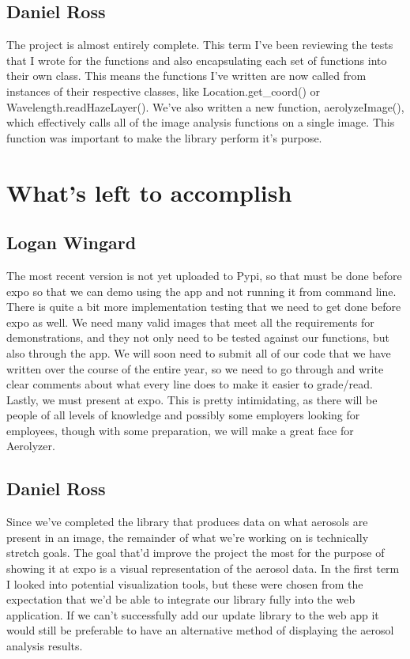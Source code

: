 \documentclass[onecolumn, draftclsnofoot,10pt, compsoc]{IEEEtran}
\begin{document}
\begin{singlespace}
		\subsection{Daniel Ross}
			The project is almost entirely complete.
			This term I've been reviewing the tests that I wrote for the functions and also encapsulating each set of functions into their own class.
			This means the functions I've written are now called from instances of their respective classes, like Location.get_coord() or Wavelength.readHazeLayer().
			We've also written a new function, aerolyzeImage(), which effectively calls all of the image analysis functions on a single image.
			This function was important to make the library perform it's purpose.
			
			
	\section{What's left to accomplish}
		
		\subsection{Logan Wingard}
			The most recent version is not yet uploaded to Pypi, so that must be done before expo so that we can demo using the app and not running it from command line.
			There is quite a bit more implementation testing that we need to get done before expo as well.
			We need many valid images that meet all the requirements for demonstrations, and they not only need to be tested against our functions, but also through the app.
			We will soon need to submit all of our code that we have written over the course of the entire year, so we need to go through and write clear comments about what every line does to make it easier to grade/read.
			Lastly, we must present at expo.
			This is pretty intimidating, as there will be people of all levels of knowledge and possibly some employers looking for employees, though with some preparation, we will make a great face for Aerolyzer.
		\subsection{Daniel Ross}
			Since we've completed the library that produces data on what aerosols are present in an image, the remainder of what we're working on is technically stretch goals.
			The goal that'd improve the project the most for the purpose of showing it at expo is a visual representation of the aerosol data.
			In the first term I looked into potential visualization tools, but these were chosen from the expectation that we'd be able to integrate our library fully into the web application.
			If we can't successfully add our update library to the web app it would still be preferable to have an alternative method of displaying the aerosol analysis results.



\end{singlespace}
\end{document}

